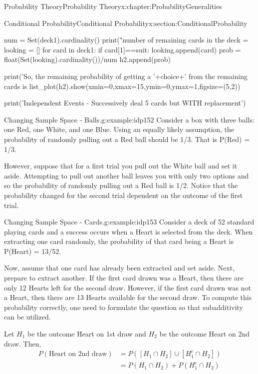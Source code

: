 \documentclass[oneside,10pt,]{book}
\numberwithin{equation}{section}
\begin{document}
\begin{chapterptx}{Probability Theory}{}{Probability Theory}{}{}{x:chapter:ProbabilityGeneralities}
\begin{sectionptx}{Conditional Probability}{}{Conditional Probability}{}{}{x:section:ConditionalProbability}
\begin{sageinput}
    num = Set(deck1).cardinality()
    print("\nThe number of remaining cards in the deck = %
    looking = []
    for card in deck1:
        if card[1]==suit:
            looking.append(card)
    prob = float(Set(looking).cardinality())/num
    h2.append(prob)
    
    print('So, the remaining probability of getting a '+choice+' from the remaining cards is %
    list_plot(h2).show(xmin=0,xmax=15,ymin=0,ymax=1,figsize=(5,2))
    
    print('Independent Events - Successively deal 5 cards but WITH replacement')
\end{sageinput}
\begin{example}{Changing Sample Space - Balls.}{g:example:idp152}%
Consider a box with three balls: one Red, one White, and one Blue.  Using an equally likely assumption, the probability of randomly pulling out a Red ball should be 1\slash{}3.  That is P(Red) = 1\slash{}3.%
\par
However, suppose that for a first trial you pull out the White ball and set it aside. Attempting to pull out another ball leaves you with only two options and so the probability of randomly pulling out a Red ball is 1\slash{}2. Notice that the probability changed for the second trial dependent on the outcome of the first trial.%
\end{example}
\begin{example}{Changing Sample Space - Cards.}{g:example:idp153}%
Consider a deck of 52 standard playing cards and a success occurs when a Heart is selected from the deck. When extracting one card randomly, the probability	of that card being a Heart is P(Heart) = 13\slash{}52.%
\par
Now, assume that one card has already been extracted and set aside.  Next, prepare to extract another. If the first card drawn was a Heart, then there are only 12 Hearts left for the second draw. However, if the first card drawn was not a Heart, then there are 13 Hearts available for the second draw. To compute this probability correctly, one need to formulate the question so that subadditivity can be utilized.%
\par
Let \(H_1\) be the outcome Heart on 1st draw and \(H_2\) be the outcome Heart on 2nd draw. Then,%
\begin{align*}
P(\text{Heart on 2nd draw}) & = P( [ H_1 \cap H_2 ] \cup [ H_1^c \cap H_2 ] )\\
& = P( H_1 \cap H_2 ) + P( H_1^c \cap H_2 )\\

\end{align*}
\end{example}
\end{sectionptx}
\end{chapterptx}
\end{document}
